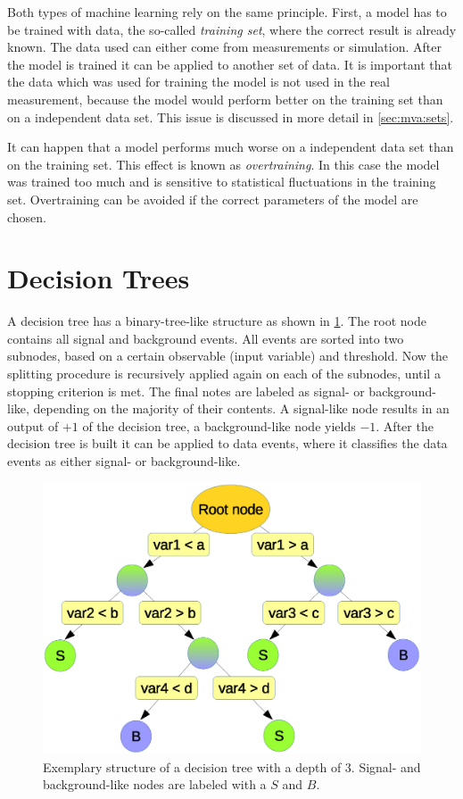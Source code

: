 Both types of machine learning rely on the same principle.
First, a model has to be trained with data, the so-called \emph{training set}, where the correct result is already known.
The data used can either come from measurements or simulation.
After the model is trained it can be applied to another set of data.
It is important that the data which was used for training the model is not used in the real measurement, because
the model would perform better on the training set than on a independent data set.
This issue is discussed in more detail in \cref{sec:mva:sets}.

It can happen that a model performs much worse on a independent data set than on the training set.
This effect is known as \emph{overtraining}.
In this case the model was trained too much and is sensitive to statistical fluctuations in the training set.
Overtraining can be avoided if the correct parameters of the model are chosen.

\section{Decision Trees}\label{sec:bdt:decision_trees}

A decision tree has a binary-tree-like structure as shown in \cref{fig:bdt:dt}.
The root node contains all signal and background events.
All events are sorted into two subnodes, based on a certain observable (input variable) and threshold.
Now the splitting procedure is recursively applied again on each of the subnodes, until a
stopping criterion is met.
The final notes are labeled as signal- or background-like, depending on the majority of their contents.
A signal-like node results in an output of $+1$ of the decision tree, a background-like node yields $-1$.
After the decision tree is built it can be applied to data events, where it classifies the data events as either
signal- or background-like.

\begin{figure}[htb]
    \begin{center}
        \includegraphics[width=0.8\linewidth]{./figures/bdts/DT.eps}
        \caption{Exemplary structure of a decision tree with a depth of $3$.
                 Signal- and background-like nodes are labeled with a $S$ and $B$.}\label{fig:bdt:dt}
    \end{center}
\end{figure}

